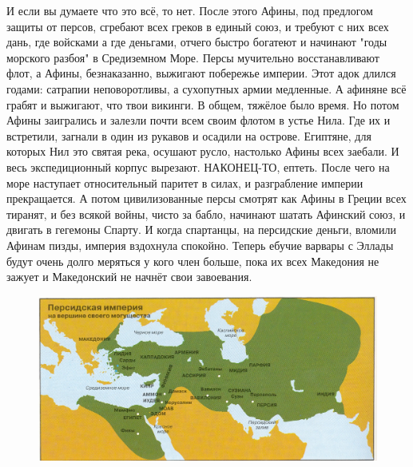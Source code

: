 И если вы думаете что это всё, то нет. После этого Афины, под предлогом защиты от персов, сгребают всех греков в единый союз, и требуют с них всех дань, где войсками а где деньгами, отчего быстро богатеют и начинают "годы морского разбоя" в Средиземном Море. Персы мучительно восстанавливают флот, а Афины, безнаказанно, выжигают побережье империи. Этот адок длился годами: сатрапии неповоротливы, а сухопутных армии медленные. А афиняне всё грабят и выжигают, что твои викинги. В общем, тяжёлое было время. Но потом Афины заигрались и залезли почти всем своим флотом в устье Нила. Где их и встретили, загнали в один из рукавов и осадили на острове. Египтяне, для которых Нил это святая река, осушают русло, настолько Афины всех заебали. И весь экспедиционный корпус вырезают. НАКОНЕЦ-ТО, ептеть. После чего на море наступает относительный паритет в силах, и разграбление империи прекращается. А потом цивилизованные персы смотрят как Афины в Греции всех тиранят, и без всякой войны, чисто за бабло, начинают шатать Афинский союз, и двигать в гегемоны Спарту. И когда спартанцы, на персидские деньги, вломили Афинам пизды, империя вздохнула спокойно. Теперь ебучие варвары с Эллады будут очень долго меряться у кого член больше, пока их всех Македония не зажует и Македонский не начнёт свои завоевания.

\begin{figure}[h!tb] 
	\centering\includegraphics[scale=0.3]{FFFAtit/1576580368153797925.png}
\end{figure}

